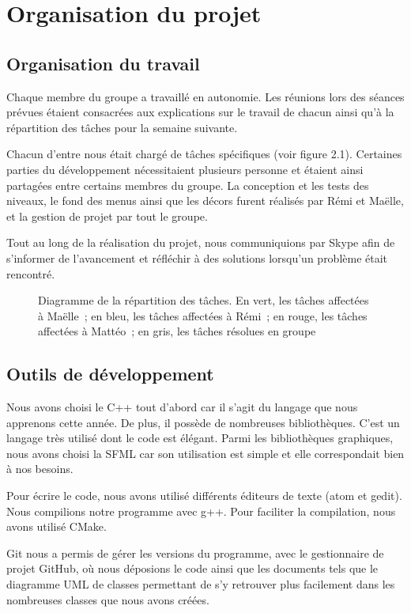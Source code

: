 \chapter{Organisation du projet}

\section{Organisation du travail}

Chaque membre du groupe a travaillé en autonomie. Les réunions lors des séances
prévues étaient consacrées aux explications sur le travail de chacun ainsi qu'à
la répartition des tâches pour la semaine suivante.

Chacun d'entre nous était chargé de tâches spécifiques (voir figure 2.1).
Certaines parties du développement nécessitaient plusieurs personne et
étaient ainsi partagées entre certains membres du groupe. La conception
et les tests des niveaux, le fond des menus ainsi que les décors furent
réalisés par Rémi et Maëlle, et la gestion de projet par tout le groupe.

Tout au long de la réalisation du projet, nous communiquions par Skype
afin de s'informer de l'avancement et réfléchir à des solutions lorsqu'un
problème était rencontré.

\begin{figure}[p!]
    \centering
    
    \caption{
        Diagramme de la répartition des tâches. En vert, les tâches
        affectées à Maëlle~; en bleu, les tâches affectées à Rémi~;
        en rouge, les tâches affectées à Mattéo~; en gris, les
        tâches résolues en groupe
    }
    \label{fig:organisation-gantt}
\end{figure}
\restoregeometry

\section{Outils de développement}

Nous avons choisi le C++ tout d'abord car il s'agit du langage que nous
apprenons cette année. De plus, il possède de nombreuses bibliothèques.
C'est un langage très utilisé dont le code est élégant. Parmi les bibliothèques
graphiques, nous avons choisi la SFML car son utilisation est simple et
elle correspondait bien à nos besoins.

Pour écrire le code, nous avons utilisé différents éditeurs de texte
(atom et gedit). Nous compilions notre programme avec g++. Pour faciliter
la compilation, nous avons utilisé CMake.

Git nous a permis de gérer les versions du programme, avec le gestionnaire
de projet GitHub, où nous déposions le code ainsi que les documents tels
que le diagramme UML de classes permettant de s'y retrouver plus facilement
dans les nombreuses classes que nous avons créées.
